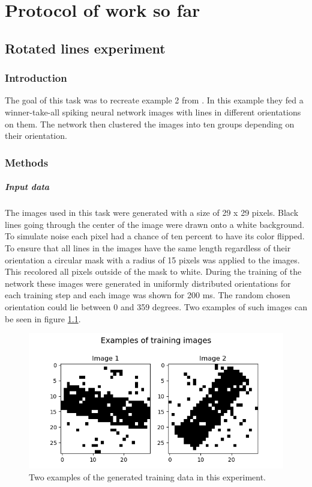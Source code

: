 \chapter{Protocol of work so far}
\section{Rotated lines experiment}

\subsection{Introduction}
The goal of this task was to recreate example 2 from \citet{nessler}. In this example they fed a winner-take-all spiking neural network images with lines in different orientations on them. The network then clustered the images into ten groups depending on their orientation.

\subsection{Methods}
\paragraph{Input data}
The images used in this task were generated with a size of 29 x 29 pixels. Black lines going through the center of the image were drawn onto a white background. To simulate noise each pixel had a chance of ten percent to have its color flipped. To ensure that all lines in the images have the same length regardless of their orientation a circular mask with a radius of 15 pixels was applied to the images. This recolored all pixels outside of the mask to white. During the training of the network these images were generated in uniformly distributed orientations for each training step and each image was shown for 200 ms. The random chosen orientation could lie between 0 and 359 degrees.  Two examples of such images can be seen in figure \ref{fig:angleImages}.

\begin{figure}
  \includegraphics[width=\linewidth]{figures/angleNetwork/trainingImages.png}
  \caption{Two examples of the generated training data in this experiment.}
  \label{fig:angleImages}
\end{figure}

